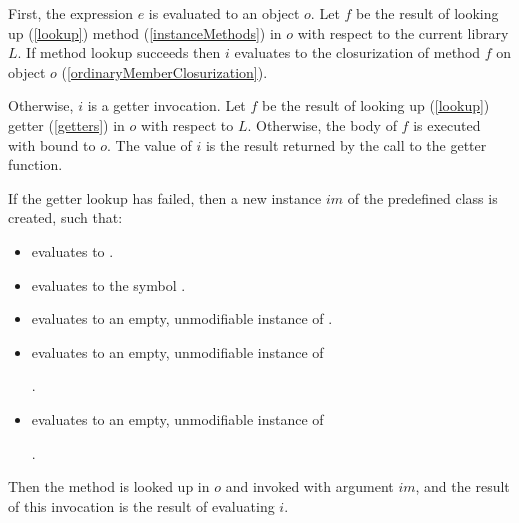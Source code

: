 \documentclass[makeidx]{article}
\begin{document}
{\LMHash{}%
First, the expression $e$ is evaluated to an object $o$.
Let $f$ be the result of looking up (\ref{lookup}) method
(\ref{instanceMethods})
\id{} in $o$ with respect to the current library $L$.
If method lookup succeeds then $i$ evaluates to
the closurization of method $f$ on object $o$
(\ref{ordinaryMemberClosurization}).


\LMHash{}%
Otherwise, $i$ is a getter invocation.
Let $f$ be the result of looking up (\ref{lookup}) getter
(\ref{getters})
\id{} in $o$ with respect to $L$.
Otherwise, the body of $f$ is executed with \THIS{} bound to $o$.
The value of $i$ is the result returned by the call to the getter function.

\LMHash{}%
If the getter lookup has failed,
then a new instance $im$ of the predefined class  is created, such that:
\begin{itemize}
\item {} evaluates to \code{\TRUE{}}.
\item {} evaluates to the symbol .
\item {} evaluates to an empty, unmodifiable instance of
.
\item {} evaluates to an empty, unmodifiable instance of

.
\item {} evaluates to an empty, unmodifiable instance of

.
\end{itemize}

\LMHash{}%
Then the method  is looked up in $o$ and invoked with argument $im$,
and the result of this invocation is the result of evaluating $i$.



}
\end{document}
